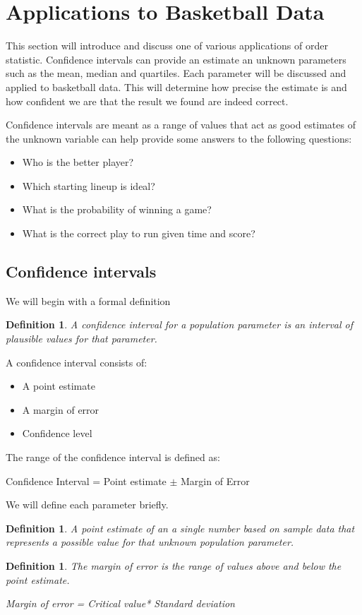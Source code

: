 \documentclass[11pt,a4paper]{article}
\theoremstyle{plain}
\newtheorem{de}[fact]{Definition}
\begin{document}
\newpage
\section{Applications to Basketball Data}
This section will introduce and discuss one of various applications of order statistic. Confidence intervals can provide an estimate an unknown parameters such as the mean, median and quartiles. Each parameter will be discussed and applied to basketball data. This will determine how precise the estimate is and how confident we are that the result we found are indeed correct.

Confidence intervals are meant as a range of values that act as good estimates of the unknown variable can help provide some answers to the following questions: 

\begin{itemize}
  \item  Who is the better player?
\item Which starting lineup is ideal?
\item What is the probability of winning a game?
\item What is the correct play to run given time and score?
\end{itemize}



\subsection{Confidence intervals}
We will begin with a formal definition
\begin{de}
A confidence interval for a population parameter is an interval of plausible values for that parameter.
\end{de}
A confidence interval consists of:
\begin{itemize}
  \item A point estimate
  \item A margin of error
  \item Confidence level
\end{itemize}
The range of the confidence interval is defined as:
\begin{center}
Confidence Interval = Point estimate $\pm$ Margin of Error
\end{center}

We will define each parameter briefly.
\begin{de}
A point estimate of an  a single number based on sample data that represents a possible value for that unknown population parameter.
\end{de}
\begin{de}
 The margin of error is the range of values above and below the point estimate.
 \begin{center}
 Margin of error = Critical value* Standard deviation
 \end{center}
 
\end{de}
\end{document}
